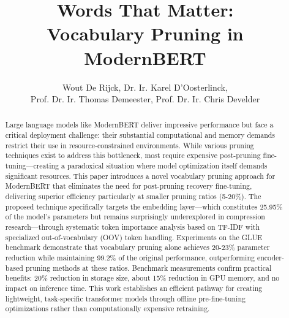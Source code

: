 \documentclass[twocolumn]{article}
\title{\huge \textbf{Words That Matter:\\ Vocabulary Pruning in ModernBERT}}
\author{Wout De Rijck, Dr. Ir. Karel D'Oosterlinck, \\ Prof. Dr. Ir. Thomas Demeester, Prof. Dr. Ir. Chris Develder}
\date{} %
\begin{document}
\maketitle







\begin{abstract}
Large language models like ModernBERT deliver impressive performance but face a critical deployment challenge: their substantial computational and memory demands restrict their use in resource-constrained environments. While various pruning techniques exist to address this bottleneck, most require expensive post-pruning fine-tuning—creating a paradoxical situation where model optimization itself demands significant resources. This paper introduces a novel vocabulary pruning approach for ModernBERT that eliminates the need for post-pruning recovery fine-tuning, delivering superior efficiency particularly at smaller pruning ratios (5-20\%). The proposed technique specifically targets the embedding layer—which constitutes 25.95\% of the model's parameters but remains surprisingly underexplored in compression research—through systematic token importance analysis based on TF-IDF with specialized out-of-vocabulary (OOV) token handling. Experiments on the GLUE benchmark demonstrate that vocabulary pruning alone achieves 20-23\% parameter reduction while maintaining 99.2\% of the original performance, outperforming encoder-based pruning methods at these ratios. 
Benchmark measurements confirm practical benefits: 20\% reduction in storage size, about 15\% reduction in GPU memory, and no impact on inference time. This work establishes an efficient pathway for creating lightweight, task-specific transformer models through offline pre-fine-tuning optimizations rather than computationally expensive retraining.
\end{abstract}
\end{document}
